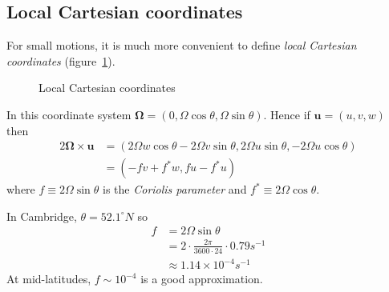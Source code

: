 \documentclass{jknotes}
\begin{document}
\subsection{Local Cartesian coordinates}
For small motions, it is much more convenient to define \emph{local Cartesian
coordinates} (figure~\ref{fig:lcc}).
\begin{figure}
	\begin{center}
	\caption{Local Cartesian coordinates}
	\label{fig:lcc}
	\end{center}
\end{figure}

In this coordinate system $\symbf{\Omega} = (0, \Omega \cos \theta, \Omega \sin
\theta)$. Hence if $\symbf{u} = (u, v, w)$ then
\begin{equation}
	\begin{aligned}
		2 \symbf{\Omega} \times \symbf{u} &= (2\Omega w \cos \theta - 2 \Omega v \sin
		\theta, 2 \Omega u \sin \theta, -2\Omega u \cos \theta) \\
		&= (-fv + f^* w, fu - f^* u)
	\end{aligned}
\end{equation}
where $f \equiv 2 \Omega \sin \theta$ is the \emph{Coriolis parameter} and
$f^* \equiv 2 \Omega \cos \theta$.

\begin{eg}
	In Cambridge, $\theta = 52.1^{\circ} N$ so
	\begin{equation}
		\begin{aligned}
			f &= 2 \Omega \sin \theta \\
			  &= 2 \cdot \frac{2\pi}{3600 \cdot 24} \cdot 0.79 s^{-1} \\
			  &\approx 1.14 \times 10^{-4} s^{-1}
		\end{aligned}
	\end{equation}
	At mid-latitudes, $f \sim 10^{-4}$ is a good approximation.
\end{eg}
\end{document}
